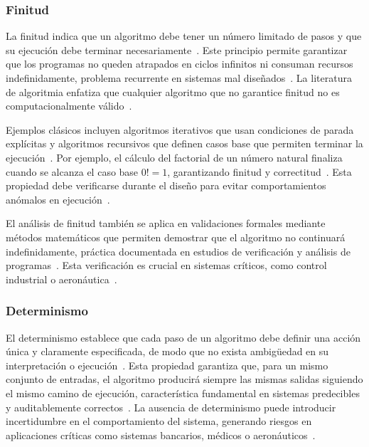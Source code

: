 \documentclass[12pt,twoside]{book}
\begin{document}
				\subsubsection{Finitud}
					La finitud indica que un algoritmo debe tener un número limitado de pasos y que su ejecución debe terminar necesariamente~\cite{Pressman2019Software}. Este principio permite garantizar que los programas no queden atrapados en ciclos infinitos ni consuman recursos indefinidamente, problema recurrente en sistemas mal diseñados~\cite{Sommerville2015Software}. La literatura de algoritmia enfatiza que cualquier algoritmo que no garantice finitud no es computacionalmente válido~\cite{Stallings2021Computer}.
					
					Ejemplos clásicos incluyen algoritmos iterativos que usan condiciones de parada explícitas y algoritmos recursivos que definen casos base que permiten terminar la ejecución~\cite{Tanenbaum2021Structured}. Por ejemplo, el cálculo del factorial de un número natural finaliza cuando se alcanza el caso base \(0! = 1\), garantizando finitud y correctitud~\cite{Gaddis2022Starting}. Esta propiedad debe verificarse durante el diseño para evitar comportamientos anómalos en ejecución~\cite{Pressman2019Software}.
					
					El análisis de finitud también se aplica en validaciones formales mediante métodos matemáticos que permiten demostrar que el algoritmo no continuará indefinidamente, práctica documentada en estudios de verificación y análisis de programas~\cite{Sommerville2015Software}. Esta verificación es crucial en sistemas críticos, como control industrial o aeronáutica~\cite{Stallings2021Computer}.
					
				\subsubsection{Determinismo}
					El determinismo establece que cada paso de un algoritmo debe definir una acción única y claramente especificada, de modo que no exista ambigüedad en su interpretación o ejecución~\cite{Pressman2019Software}. Esta propiedad garantiza que, para un mismo conjunto de entradas, el algoritmo producirá siempre las mismas salidas siguiendo el mismo camino de ejecución, característica fundamental en sistemas predecibles y auditablemente correctos~\cite{Sommerville2015Software}. La ausencia de determinismo puede introducir incertidumbre en el comportamiento del sistema, generando riesgos en aplicaciones críticas como sistemas bancarios, médicos o aeronáuticos~\cite{Stallings2021Computer}.
					
\end{document}
